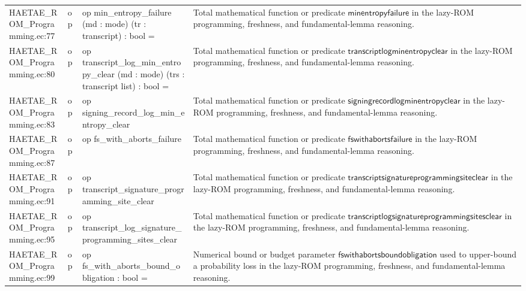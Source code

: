 \documentclass[10pt]{article}
\begin{document}
\begin{longtable}{L{0.11\textwidth}L{0.055\textwidth}L{0.385\textwidth}L{0.41\textwidth}}
HAETAE\_\allowbreak{}ROM\_\allowbreak{}Programming.\allowbreak{}ec:\allowbreak{}77 & op & {\ttfamily\scriptsize op min\_\allowbreak{}entropy\_\allowbreak{}failure (md : mode) (tr : transcript) : bool =} & Total mathematical function or predicate $\mathsf{minentropyfailure}$ in the lazy-ROM programming, freshness, and fundamental-lemma reasoning. \\
HAETAE\_\allowbreak{}ROM\_\allowbreak{}Programming.\allowbreak{}ec:\allowbreak{}80 & op & {\ttfamily\scriptsize op transcript\_\allowbreak{}log\_\allowbreak{}min\_\allowbreak{}entropy\_\allowbreak{}clear (md : mode) (trs : transcript list) : bool =} & Total mathematical function or predicate $\mathsf{transcriptlogminentropyclear}$ in the lazy-ROM programming, freshness, and fundamental-lemma reasoning. \\
HAETAE\_\allowbreak{}ROM\_\allowbreak{}Programming.\allowbreak{}ec:\allowbreak{}83 & op & {\ttfamily\scriptsize op signing\_\allowbreak{}record\_\allowbreak{}log\_\allowbreak{}min\_\allowbreak{}entropy\_\allowbreak{}clear} & Total mathematical function or predicate $\mathsf{signingrecordlogminentropyclear}$ in the lazy-ROM programming, freshness, and fundamental-lemma reasoning. \\
HAETAE\_\allowbreak{}ROM\_\allowbreak{}Programming.\allowbreak{}ec:\allowbreak{}87 & op & {\ttfamily\scriptsize op fs\_\allowbreak{}with\_\allowbreak{}aborts\_\allowbreak{}failure} & Total mathematical function or predicate $\mathsf{fswithabortsfailure}$ in the lazy-ROM programming, freshness, and fundamental-lemma reasoning. \\
HAETAE\_\allowbreak{}ROM\_\allowbreak{}Programming.\allowbreak{}ec:\allowbreak{}91 & op & {\ttfamily\scriptsize op transcript\_\allowbreak{}signature\_\allowbreak{}programming\_\allowbreak{}site\_\allowbreak{}clear} & Total mathematical function or predicate $\mathsf{transcriptsignatureprogrammingsiteclear}$ in the lazy-ROM programming, freshness, and fundamental-lemma reasoning. \\
HAETAE\_\allowbreak{}ROM\_\allowbreak{}Programming.\allowbreak{}ec:\allowbreak{}95 & op & {\ttfamily\scriptsize op transcript\_\allowbreak{}log\_\allowbreak{}signature\_\allowbreak{}programming\_\allowbreak{}sites\_\allowbreak{}clear} & Total mathematical function or predicate $\mathsf{transcriptlogsignatureprogrammingsitesclear}$ in the lazy-ROM programming, freshness, and fundamental-lemma reasoning. \\
HAETAE\_\allowbreak{}ROM\_\allowbreak{}Programming.\allowbreak{}ec:\allowbreak{}99 & op & {\ttfamily\scriptsize op fs\_\allowbreak{}with\_\allowbreak{}aborts\_\allowbreak{}bound\_\allowbreak{}obligation : bool =} & Numerical bound or budget parameter $\mathsf{fswithabortsboundobligation}$ used to upper-bound a probability loss in the lazy-ROM programming, freshness, and fundamental-lemma reasoning. \\

\end{longtable}
\end{document}
